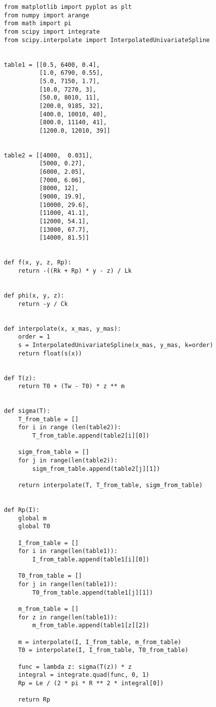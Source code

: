 \documentclass[a4paper, 14pt]{article}
\begin{document}
	\begin{lstlisting}[label=some-code,caption=Листинг программы]
from matplotlib import pyplot as plt
from numpy import arange
from math import pi
from scipy import integrate
from scipy.interpolate import InterpolatedUnivariateSpline


table1 = [[0.5, 6400, 0.4],
          [1.0, 6790, 0.55],
          [5.0, 7150, 1.7],
          [10.0, 7270, 3],
          [50.0, 8010, 11],
          [200.0, 9185, 32],
          [400.0, 10010, 40],
          [800.0, 11140, 41],
          [1200.0, 12010, 39]]


table2 = [[4000,  0.031],
          [5000, 0.27],
          [6000, 2.05],
          [7000, 6.06],
          [8000, 12],
          [9000, 19.9],
          [10000, 29.6],
          [11000, 41.1],
          [12000, 54.1],
          [13000, 67.7],
          [14000, 81.5]]


def f(x, y, z, Rp):
    return -((Rk + Rp) * y - z) / Lk


def phi(x, y, z):
    return -y / Ck


def interpolate(x, x_mas, y_mas):
    order = 1
    s = InterpolatedUnivariateSpline(x_mas, y_mas, k=order)
    return float(s(x))


def T(z):
    return T0 + (Tw - T0) * z ** m


def sigma(T):
    T_from_table = []
    for i in range (len(table2)):
        T_from_table.append(table2[i][0])

    sigm_from_table = []
    for j in range(len(table2)):
        sigm_from_table.append(table2[j][1])

    return interpolate(T, T_from_table, sigm_from_table)


def Rp(I):
    global m
    global T0

    I_from_table = []
    for i in range(len(table1)):
        I_from_table.append(table1[i][0])

    T0_from_table = []
    for j in range(len(table1)):
        T0_from_table.append(table1[j][1])

    m_from_table = []
    for z in range(len(table1)):
        m_from_table.append(table1[z][2])

    m = interpolate(I, I_from_table, m_from_table)
    T0 = interpolate(I, I_from_table, T0_from_table)

    func = lambda z: sigma(T(z)) * z
    integral = integrate.quad(func, 0, 1)
    Rp = Le / (2 * pi * R ** 2 * integral[0])

    return Rp



\end{lstlisting}
\end{document}
